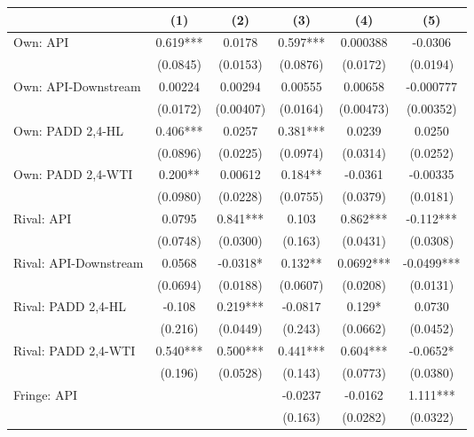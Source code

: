 {
\def\sym#1{\ifmmode^{#1}\else\(^{#1}\)\fi}
\begin{tabular}{l*{5}{c}}
\toprule
                &\multicolumn{1}{c}{(1)}   &\multicolumn{1}{c}{(2)}   &\multicolumn{1}{c}{(3)}   &\multicolumn{1}{c}{(4)}   &\multicolumn{1}{c}{(5)}   \\
\midrule
Own: API        &    0.619***&   0.0178   &    0.597***& 0.000388   &  -0.0306   \\
                & (0.0845)   & (0.0153)   & (0.0876)   & (0.0172)   & (0.0194)   \\
\addlinespace
Own: API-Downstream&  0.00224   &  0.00294   &  0.00555   &  0.00658   &-0.000777   \\
                & (0.0172)   &(0.00407)   & (0.0164)   &(0.00473)   &(0.00352)   \\
\addlinespace
Own: PADD 2,4-HL&    0.406***&   0.0257   &    0.381***&   0.0239   &   0.0250   \\
                & (0.0896)   & (0.0225)   & (0.0974)   & (0.0314)   & (0.0252)   \\
\addlinespace
Own: PADD 2,4-WTI&    0.200** &  0.00612   &    0.184** &  -0.0361   & -0.00335   \\
                & (0.0980)   & (0.0228)   & (0.0755)   & (0.0379)   & (0.0181)   \\
\addlinespace
Rival: API      &   0.0795   &    0.841***&    0.103   &    0.862***&   -0.112***\\
                & (0.0748)   & (0.0300)   &  (0.163)   & (0.0431)   & (0.0308)   \\
\addlinespace
Rival: API-Downstream&   0.0568   &  -0.0318*  &    0.132** &   0.0692***&  -0.0499***\\
                & (0.0694)   & (0.0188)   & (0.0607)   & (0.0208)   & (0.0131)   \\
\addlinespace
Rival: PADD 2,4-HL&   -0.108   &    0.219***&  -0.0817   &    0.129*  &   0.0730   \\
                &  (0.216)   & (0.0449)   &  (0.243)   & (0.0662)   & (0.0452)   \\
\addlinespace
Rival: PADD 2,4-WTI&    0.540***&    0.500***&    0.441***&    0.604***&  -0.0652*  \\
                &  (0.196)   & (0.0528)   &  (0.143)   & (0.0773)   & (0.0380)   \\
\addlinespace
Fringe: API     &            &            &  -0.0237   &  -0.0162   &    1.111***\\
                &            &            &  (0.163)   & (0.0282)   & (0.0322)   \\

\end{tabular}}
